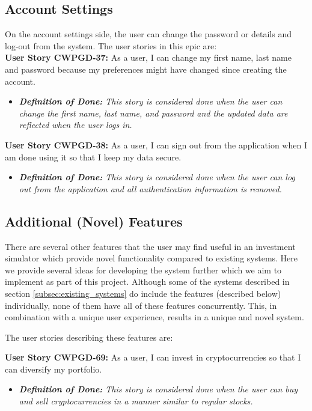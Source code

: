 \subsection{Account Settings}
    \label{subsec:account_settings}

On the account settings side, the user can change the password or details and log-out from the system. The user stories in this epic are:\\

\noindent \textbf{User Story CWPGD-37:} As a user, I can change my first name, last name and password because my preferences might have changed since creating the account.
\begin{itemize}
	\item \textit{\textbf{Definition of Done:} This story is considered done when the user can change the first name, last name, and password and the updated data are reflected when the user logs in.} 
\end{itemize}

\noindent \textbf{User Story CWPGD-38:} As a user, I can sign out from the application when I am done using it so that I keep my data secure.
\begin{itemize}
	\item \textit{\textbf{Definition of Done:} This story is considered done when the user can log out from the application and all authentication information is removed.} 
\end{itemize}



\subsection{Additional (Novel) Features}
    \label{subsec:additional_features}
There are several other features that the user may find useful in an investment simulator which provide novel functionality compared to existing systems. Here we provide several ideas for developing the system further which we aim to implement as part of this project. Although some of the systems described in section \ref{subsec:existing_systems} do include the features (described below) individually, none of them have all of these features concurrently. This, in combination with a unique user experience, results in a unique and novel system. 

The user stories describing these features are:

\noindent \textbf{User Story CWPGD-69:} As a user, I can invest in cryptocurrencies so that I can diversify my portfolio.
\begin{itemize}
	\item \textit{\textbf{Definition of Done:} This story is considered done when the user can buy and sell cryptocurrencies in a manner similar to regular stocks.} 
\end{itemize}

